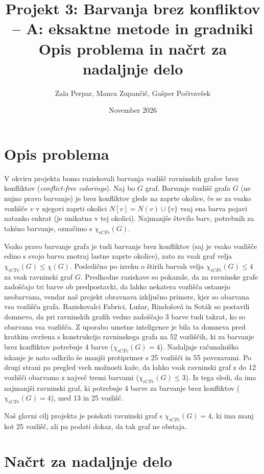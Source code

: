 \documentclass[11pt, a4paper]{article}
\title{\textbf{Projekt 3: Barvanja brez konfliktov – A: eksaktne metode in gradniki} \\[0.5cm] \large Opis problema in načrt za nadaljnje delo}
\author{Zala Perpar, Manca Zupančič, Gašper Počivavšek}
\date{November 2026}
\begin{document}
\maketitle

\section*{Opis problema}
V okviru projekta bomo raziskovali barvanja vozlišč ravninskih grafov brez konfliktov (\textit{conflict-free colorings}). Naj bo $G$ graf. Barvanje vozlišč grafa $G$ (ne nujno pravo barvanje) je brez konfliktov glede na zaprte okolice, če se za vsako vozlišče $v$ v njegovi zaprti okolici $N[v] = N(v) \cup \{v\}$ vsaj ena barva pojavi natanko enkrat (je unikatna v tej okolici). Najmanjše število barv, potrebnih za takšno barvanje, označimo s $\chi_{iCFc}(G)$.

Vsako pravo barvanje grafa je tudi barvanje brez konfliktov (saj je vsako vozlišče edino s svojo barvo znotraj lastne zaprte okolice), zato za vsak graf velja $\chi_{iCFc}(G) \le \chi(G)$. Posledično po izreku o štirih barvah velja $\chi_{iCFc}(G) \le 4$ za vsak ravninski graf $G$. Predhodne raziskave so pokazale, da za ravninske grafe zadoščajo tri barve ob predpostavki, da lahko nekatera vozlišča ostanejo neobarvana, vendar naš projekt obravnava izključno primere, kjer so obarvana vsa vozlišča grafa. Raziskovalci Fabrici, Lužar, Rindošová in Soták so postavili domnevo, da pri ravninskih grafih vedno zadoščajo 3 barve tudi takrat, ko so obarvana vsa vozlišča. Z uporabo umetne inteligence je bila ta domneva pred kratkim ovržena s konstrukcijo ravninskega grafa na 52 vozliščih, ki za barvanje brez konfliktov potrebuje 4 barve ($\chi_{iCFc}(G) = 4$). Nadaljnje računalniško iskanje je nato odkrilo še manjši protiprimer s 25 vozlišči in 55 povezavami. Po drugi strani pa pregled vseh možnosti kaže, da lahko vsak ravninski graf z do 12 vozlišči obarvamo z največ tremi barvami ($\chi_{iCFc}(G) \le 3$). Iz tega sledi, da ima najmanjši ravninski graf, ki potrebuje 4 barve za barvanje brez konfliktov ($\chi_{iCFc}(G) = 4$), med 13 in 25 vozlišč.

Naš glavni cilj projekta je poiskati ravninski graf s $\chi_{iCFc}(G) = 4$, ki ima manj kot 25 vozlišč, ali pa podati dokaz, da tak graf ne obstaja.

\section*{Načrt za nadaljnje delo}
\end{document}
